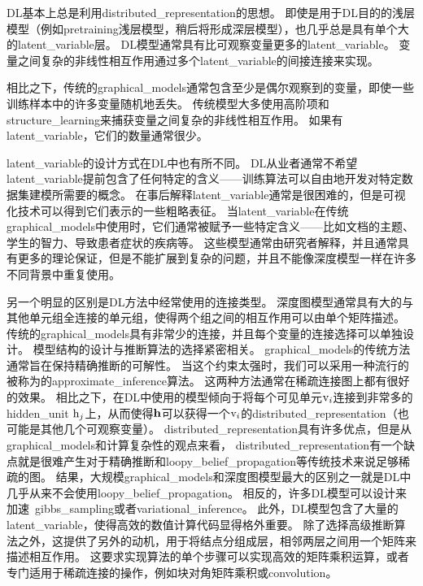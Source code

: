 \gls{DL}基本上总是利用\gls{distributed_representation}的思想。
即使是用于\gls{DL}目的的浅层模型（例如\gls{pretraining}浅层模型，稍后将形成深层模型），也几乎总是具有单个大的\gls{latent_variable}层。
\gls{DL}模型通常具有比可观察变量更多的\gls{latent_variable}。
变量之间复杂的非线性相互作用通过多个\gls{latent_variable}的间接连接来实现。


相比之下，传统的\gls{graphical_models}通常包含至少是偶尔观察到的变量，即使一些训练样本中的许多变量随机地丢失。
传统模型大多使用高阶项和\gls{structure_learning}来捕获变量之间复杂的非线性相互作用。
如果有\gls{latent_variable}，它们的数量通常很少。



\gls{latent_variable}的设计方式在\gls{DL}中也有所不同。
\gls{DL}从业者通常不希望\gls{latent_variable}提前包含了任何特定的含义——训练算法可以自由地开发对特定数据集建模所需要的概念。
在事后解释\gls{latent_variable}通常是很困难的，但是可视化技术可以得到它们表示的一些粗略表征。
当\gls{latent_variable}在传统\gls{graphical_models}中使用时，它们通常被赋予一些特定含义——比如文档的主题、学生的智力、导致患者症状的疾病等。
这些模型通常由研究者解释，并且通常具有更多的理论保证，但是不能扩展到复杂的问题，并且不能像深度模型一样在许多不同背景中重复使用。


另一个明显的区别是\gls{DL}方法中经常使用的连接类型。
深度图模型通常具有大的与其他单元组全连接的单元组，使得两个组之间的相互作用可以由单个矩阵描述。
传统的\gls{graphical_models}具有非常少的连接，并且每个变量的连接选择可以单独设计。
模型结构的设计与推断算法的选择紧密相关。
\gls{graphical_models}的传统方法通常旨在保持精确推断的可解性。
当这个约束太强时，我们可以采用一种流行的被称为的\gls{approximate_inference}算法。
这两种方法通常在稀疏连接图上都有很好的效果。
相比之下，在\gls{DL}中使用的模型倾向于将每个可见单元$\mathrm{v}_i$连接到非常多的\gls{hidden_unit} $\mathrm{h}_j$上，从而使得$\mathbf{h}$可以获得一个$\mathrm{v}_i$的\gls{distributed_representation}（也可能是其他几个可观察变量）。
\gls{distributed_representation}具有许多优点，但是从\gls{graphical_models}和计算复杂性的观点来看，
\gls{distributed_representation}有一个缺点就是很难产生对于精确推断和\gls{loopy_belief_propagation}等传统技术来说足够稀疏的图。
结果，大规模\gls{graphical_models}和深度图模型最大的区别之一就是\gls{DL}中几乎从来不会使用\gls{loopy_belief_propagation}。
相反的，许多\gls{DL}模型可以设计来加速~\gls{gibbs_sampling}或者\gls{variational_inference}。
此外，\gls{DL}模型包含了大量的\gls{latent_variable}，使得高效的数值计算代码显得格外重要。
除了选择高级推断算法之外，这提供了另外的动机，用于将结点分组成层，相邻两层之间用一个矩阵来描述相互作用。
这要求实现算法的单个步骤可以实现高效的矩阵乘积运算，或者专门适用于稀疏连接的操作，例如块对角矩阵乘积或\gls{convolution}。



